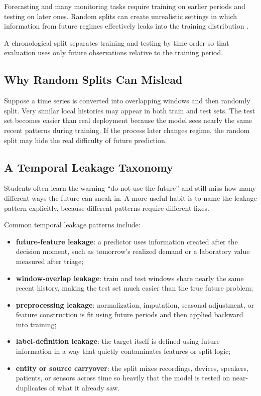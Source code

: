 Forecasting and many monitoring tasks require training on earlier periods and testing on later ones. Random splits can create unrealistic settings in which information from future regimes effectively leaks into the training distribution \citep{roberts2017}.

\begin{definition}
A chronological split separates training and testing by time order so that evaluation uses only future observations relative to the training period.
\end{definition}

\subsection{Why Random Splits Can Mislead}

Suppose a time series is converted into overlapping windows and then randomly split. Very similar local histories may appear in both train and test sets. The test set becomes easier than real deployment because the model sees nearly the same recent patterns during training. If the process later changes regime, the random split may hide the real difficulty of future prediction.

\subsection{A Temporal Leakage Taxonomy}

Students often learn the warning ``do not use the future'' and still miss how many different ways the future can sneak in. A more useful habit is to name the leakage pattern explicitly, because different patterns require different fixes.

Common temporal leakage patterns include:
\begin{itemize}[leftmargin=*]
\item \textbf{future-feature leakage}: a predictor uses information created after the decision moment, such as tomorrow's realized demand or a laboratory value measured after triage;
\item \textbf{window-overlap leakage}: train and test windows share nearly the same recent history, making the test set much easier than the true future problem;
\item \textbf{preprocessing leakage}: normalization, imputation, seasonal adjustment, or feature construction is fit using future periods and then applied backward into training;
\item \textbf{label-definition leakage}: the target itself is defined using future information in a way that quietly contaminates features or split logic;
\item \textbf{entity or source carryover}: the split mixes recordings, devices, speakers, patients, or sensors across time so heavily that the model is tested on near-duplicates of what it already saw.
\end{itemize}

